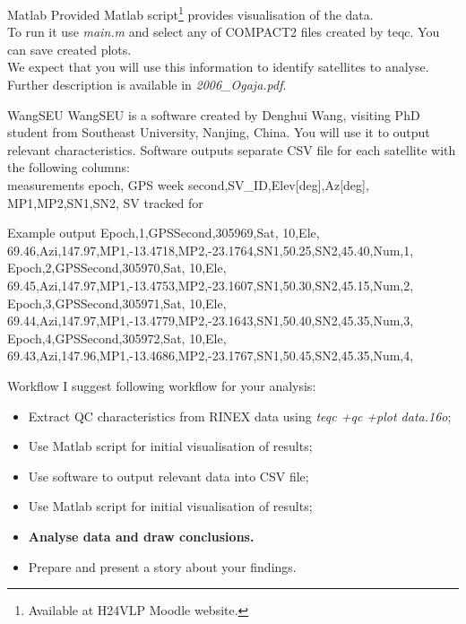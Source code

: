 \documentclass[11pt]{beamer}
\begin{document}
	\begin{frame}{Matlab}
		Provided Matlab script\footnote{Available at H24VLP Moodle website.} provides visualisation of the data.\\
		To run it use \textit{main.m} and select any of COMPACT2 files created by teqc. You can save created plots.\\
		We expect that you will use this information to identify satellites to analyse.
		\medskip
		Further description is available in \textit{2006\_Ogaja.pdf}.
	\end{frame}	

	\begin{frame}[allowframebreaks]{WangSEU}
		WangSEU is a software created by Denghui Wang, visiting PhD student from Southeast University, Nanjing, China. You will use it to output relevant characteristics. Software outputs separate CSV file for each satellite with the following columns:\\
\tiny{measurements epoch,  GPS week second,SV\_ID,Elev[deg],Az[deg], MP1,MP2,SN1,SN2, SV tracked for}
	\begin{exampleblock}{Example output}{
\tiny{
Epoch,1,GPSSecond,305969,Sat, 10,Ele, 69.46,Azi,147.97,MP1,-13.4718,MP2,-23.1764,SN1,50.25,SN2,45.40,Num,1,\\
Epoch,2,GPSSecond,305970,Sat, 10,Ele, 69.45,Azi,147.97,MP1,-13.4753,MP2,-23.1607,SN1,50.30,SN2,45.15,Num,2,\\
Epoch,3,GPSSecond,305971,Sat, 10,Ele, 69.44,Azi,147.97,MP1,-13.4779,MP2,-23.1643,SN1,50.40,SN2,45.35,Num,3,\\
Epoch,4,GPSSecond,305972,Sat, 10,Ele, 69.43,Azi,147.96,MP1,-13.4686,MP2,-23.1767,SN1,50.45,SN2,45.35,Num,4,\\
}
		}
	\end{exampleblock}
	

	\end{frame}

	\begin{frame}{Workflow}
		I suggest following workflow for your analysis:
		
		\begin{itemize}
			\item Extract QC characteristics from RINEX data using \textit{ teqc +qc +plot data.16o};
			\item Use Matlab script for initial visualisation of results;
			\item Use software to output relevant data into CSV file;
			\item Use Matlab script for initial visualisation of results;
			\item \textbf{Analyse data and draw conclusions.}
			\item \alert{Prepare and present a story about your findings.}
		\end{itemize}

	\end{frame}
\end{document}
